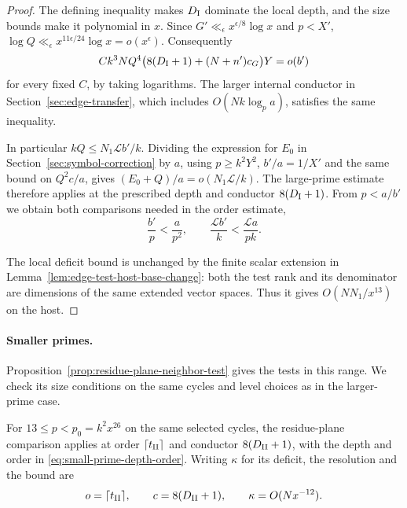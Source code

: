 \begin{proof}
The defining inequality makes \(D_{\rm I}\) dominate the local
depth, and the size bounds make it polynomial in \(x\).
Since \(G'\ll_\epsilon x^{\epsilon/8}\log x\) and \(p<X'\),
\(\log Q\ll_\epsilon x^{11\epsilon/24}\log x=o(x^\epsilon)\).
Consequently
\[
 C k^3NQ^4\big(8(D_{\rm I}+1)+(N+n')c_G\big)Y=o(b')
\]
for every fixed \(C\), by taking logarithms. The larger internal
conductor in Section~\ref{sec:edge-transfer}, which includes
\(O(Nk\log_p a)\), satisfies the same inequality.

In particular
\(kQ\le N_1\mathcal L b'/k\). Dividing the expression for \(E_0\)
in Section~\ref{sec:symbol-correction} by \(a\), using
\(p\ge k^2Y^2\), \(b'/a=1/X'\) and the same bound on
\(Q^2c/a\), gives \((E_0+Q)/a=o(N_1\mathcal L/k)\).
The large-prime estimate therefore applies at the prescribed depth
and conductor \(8(D_{\rm I}+1)\). From \(p<a/b'\) we obtain both comparisons needed in the order estimate,
\[
 \frac{b'}p<\frac a{p^2},\qquad \frac{\mathcal L b'}k<\frac{\mathcal L a}{pk}.
\]

The local deficit bound is unchanged by the finite scalar
extension in Lemma~\ref{lem:edge-test-host-base-change}: both
the test rank and its denominator are dimensions of the same
extended vector spaces. Thus it gives \(O(NN_1/x^{13})\)
on the host.
\end{proof}

\paragraph{Smaller primes.}
Proposition~\ref{prop:residue-plane-neighbor-test} gives the
tests in this range. We check its size conditions on the
same cycles and level choices as in the larger-prime case.

\begin{proposition}
\label{prop:host-small-prime-test}
For \(13\le p<p_0=k^2x^{26}\) on the same selected cycles,
the residue-plane comparison applies at order
\(\lceil t_{\rm II}\rceil\) and conductor \(8(D_{\rm II}+1)\),
with the depth and order in \eqref{eq:small-prime-depth-order}.
Writing \(\kappa\) for its deficit, the resolution and the bound are
\[
 o=\lceil t_{\rm II}\rceil,\qquad c=8(D_{\rm II}+1),\qquad\kappa=O(Nx^{-12}).
\]

\end{proposition}

